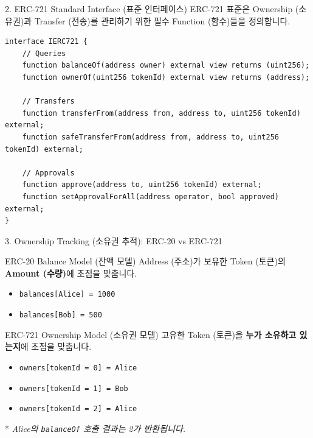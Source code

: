 \documentclass[aspectratio=169]{beamer}
\begin{document}
\begin{frame}[fragile]{2. ERC-721 Standard Interface (표준 인터페이스)}
    ERC-721 표준은 Ownership (소유권)과 Transfer (전송)를 관리하기 위한 필수 Function (함수)들을 정의합니다.
    
    \vspace{0.3cm}
    \begin{lstlisting}[language=Solidity, caption={Core IERC721 Functions}]
interface IERC721 {
    // Queries
    function balanceOf(address owner) external view returns (uint256);
    function ownerOf(uint256 tokenId) external view returns (address);

    // Transfers
    function transferFrom(address from, address to, uint256 tokenId) external;
    function safeTransferFrom(address from, address to, uint256 tokenId) external;

    // Approvals
    function approve(address to, uint256 tokenId) external;
    function setApprovalForAll(address operator, bool approved) external;
}
    \end{lstlisting}
\end{frame}

\begin{frame}{3. Ownership Tracking (소유권 추적): ERC-20 vs ERC-721}
    \begin{block}{ERC-20 Balance Model (잔액 모델)}
        Address (주소)가 보유한 Token (토큰)의 \textbf{Amount (수량)}에 초점을 맞춥니다.
        \begin{itemize}
            \item \texttt{balances[Alice] = 1000}
            \item \texttt{balances[Bob] = 500}
        \end{itemize}
    \end{block}

    \begin{block}{ERC-721 Ownership Model (소유권 모델)}
        고유한 Token (토큰)을 \textbf{누가 소유하고 있는지}에 초점을 맞춥니다.
        \begin{itemize}
            \item \texttt{owners[tokenId = 0] = Alice}
            \item \texttt{owners[tokenId = 1] = Bob}
            \item \texttt{owners[tokenId = 2] = Alice}
        \end{itemize}
        * \textit{Alice의 \texttt{balanceOf} 호출 결과는 2가 반환됩니다.}
    \end{block}
\end{frame}
\end{document}
